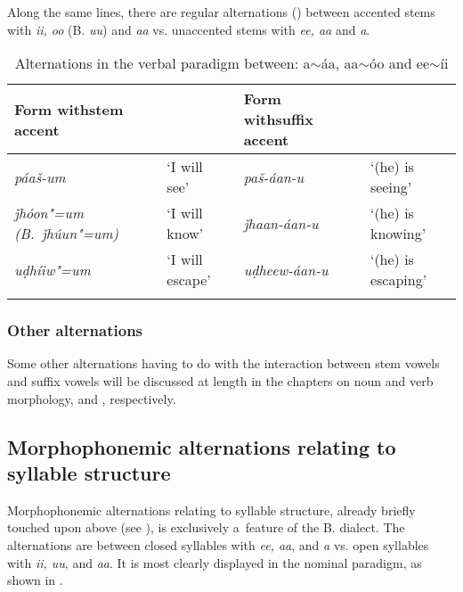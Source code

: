Along the same lines, there are regular alternations () between accented stems with \textit{ii, oo} (B. \textit{uu}) and \textit{aa} vs. unaccented stems with \textit{ee, aa} and \textit{a}.



\begin{table}[ht]
\caption{Alternations in the verbal paradigm between: a$\sim$áa, aa$\sim$óo and ee$\sim$íi}
\begin{tabularx}{\textwidth}{ Q l Q l }
\lsptoprule
Form with\newline stem accent &
&
Form with\newline suffix accent &
\\\hline
\textit{páaš-um} &
`I will see' &
\textit{paš-áan-u} &
`(he) is seeing'\\
\textit{ǰhóon"=um (B.~ǰhúun"=um)} &
`I will know' &
\textit{ǰhaan-áan-u} &
`(he) is knowing'\\
\textit{uḍhíiw"=um} &
`I will escape' &
\textit{uḍheew-áan-u} &
`(he) is escaping'\\\lspbottomrule
\end{tabularx}
\label{tab:3-14}
\end{table}

\subsubsection*{Other alternations}

Some other alternations having to do with the interaction between stem vowels and suffix vowels will
be discussed at length in the chapters on noun and verb morphology,  and
, respectively.

\subsection{Morphophonemic alternations relating to syllable structure}
\label{subsec:3-5-2}


Morphophonemic alternations relating to syllable structure, already briefly touched upon above (see ), is exclusively a~feature of the B. dialect. The alternations are between closed syllables with \textit{ee, aa}, and \textit{a} vs. open syllables with \textit{ii, uu}, and \textit{aa}. It is most clearly displayed in the nominal paradigm, as shown in .



